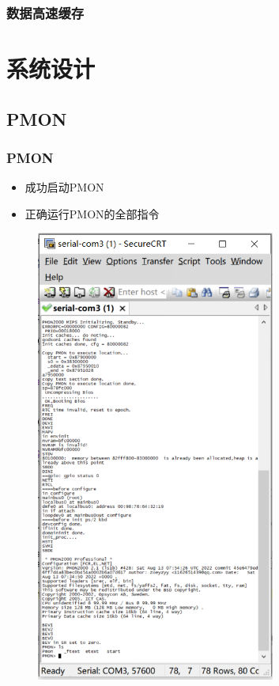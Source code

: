 \documentclass{beamer}
\begin{document}
\begin{frame}
    \frametitle{数据高速缓存}
\end{frame}

\section{系统设计}

\subsection{PMON}

\begin{frame}
    \frametitle{PMON}

    \begin{minipage}[c]{0.4\linewidth}
        \begin{itemize}
        \item 成功启动PMON
        \item 正确运行PMON的全部指令
        \end{itemize}
    \end{minipage}
    \hfill
    \begin{minipage}{0.5\linewidth}
        \begin{figure}
            \centering
            \includegraphics[width=0.7\textwidth]{pic/PMON.png}
        \end{figure}
    \end{minipage}

\end{frame}
\end{document}
